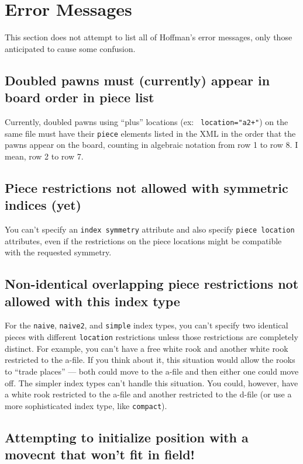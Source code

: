 \documentclass[11pt]{article}
\begin{document}
\section{Error Messages}

This section does not attempt to list all of Hoffman's error messages,
only those anticipated to cause some confusion.

\subsection{Doubled pawns must (currently) appear in board order in piece list}

Currently, doubled pawns using ``plus'' locations (ex: {\tt
location="a2+"}) on the same file must have their {\tt piece} elements
listed in the XML in the order that the pawns appear on the board,
counting in algebraic notation from row 1 to row 8.  I mean, row 2 to
row 7.

\subsection{Piece restrictions not allowed with symmetric indices (yet)}

You can't specify an {\tt index symmetry} attribute and also specify
{\tt piece location} attributes, even if the restrictions on the piece
locations might be compatible with the requested symmetry.

\subsection{Non-identical overlapping piece restrictions not allowed with this index type}

For the {\tt naive}, {\tt naive2}, and {\tt simple} index types, you
can't specify two identical pieces with different {\tt location}
restrictions unless those restrictions are completely distinct.  For
example, you can't have a free white rook and another white rook
restricted to the a-file.  If you think about it, this situation would
allow the rooks to ``trade places'' --- both could move to the a-file
and then either one could move off.  The simpler index types can't
handle this situation.  You could, however, have a white rook
restricted to the a-file and another restricted to the d-file (or use
a more sophisticated index type, like {\tt compact}).

\subsection{Attempting to initialize position with a movecnt that won't fit in field!}
\end{document}
